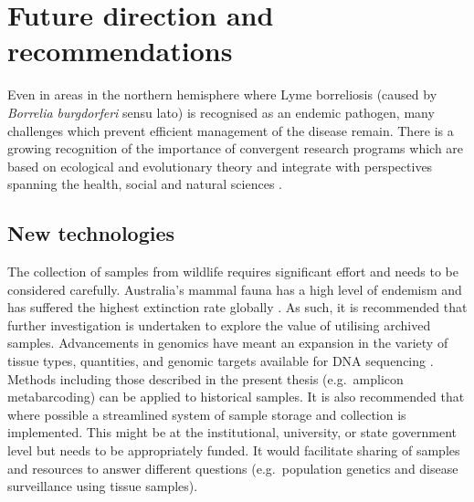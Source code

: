 \documentclass[a4paper, nobind]{templates/ociamthesis}
\begin{document}
\hypertarget{future-direction-and-recommendations}{%
\section{Future direction and recommendations}\label{future-direction-and-recommendations}}

Even in areas in the northern hemisphere where Lyme borreliosis (caused by \emph{Borrelia burgdorferi} sensu lato) is recognised as an endemic pathogen, many challenges which prevent efficient management of the disease remain.
There is a growing recognition of the importance of convergent research programs which are based on ecological and evolutionary theory and integrate with perspectives spanning the health, social and natural sciences \autocite{talbotConvergenceResearchEmerging2021}.

\hypertarget{new-technologies}{%
\subsection{New technologies}\label{new-technologies}}

The collection of samples from wildlife requires significant effort and needs to be considered carefully.
Australia's mammal fauna has a high level of endemism and has suffered the highest extinction rate globally \autocite{flemingGoodBadUgly2016}.
As such, it is recommended that further investigation is undertaken to explore the value of utilising archived samples.
Advancements in genomics have meant an expansion in the variety of tissue types, quantities, and genomic targets available for DNA sequencing \autocite{fitakExpectationsChallengesWildlife2019}.
Methods including those described in the present thesis (e.g.~amplicon metabarcoding) can be applied to historical samples.
It is also recommended that where possible a streamlined system of sample storage and collection is implemented.
This might be at the institutional, university, or state government level but needs to be appropriately funded.
It would facilitate sharing of samples and resources to answer different questions (e.g.~population genetics and disease surveillance using tissue samples).
\end{document}
